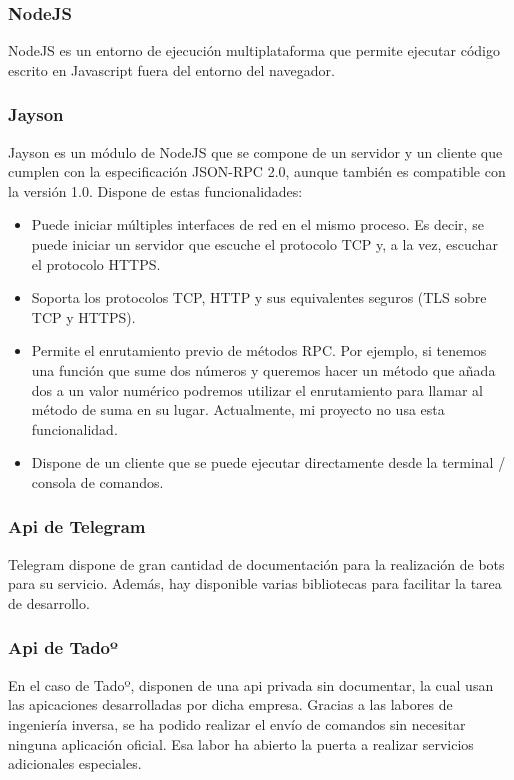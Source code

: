 \documentclass[spanish,12pt, a4paper, twoside]{paper}
\begin{document}
\subsubsection{NodeJS}

NodeJS es un entorno de ejecución multiplataforma que permite ejecutar código escrito en Javascript fuera del entorno del navegador.

\subsubsection{Jayson}

Jayson es un módulo de NodeJS que se compone de un servidor y un cliente que cumplen con la especificación JSON-RPC 2.0, aunque también es compatible con la versión 1.0. Dispone de estas funcionalidades:

\begin{itemize}
\item Puede iniciar múltiples interfaces de red en el mismo proceso. Es decir, se puede iniciar un servidor que escuche el protocolo TCP y, a la vez, escuchar el protocolo HTTPS.
\item Soporta los protocolos TCP, HTTP y sus equivalentes seguros (TLS sobre TCP y HTTPS).
\item Permite el enrutamiento previo de métodos RPC. Por ejemplo, si tenemos una función que sume dos números y queremos hacer un método que añada dos a un valor numérico podremos utilizar el enrutamiento para llamar al método de suma en su lugar. Actualmente, mi proyecto no usa esta funcionalidad.
\item Dispone de un cliente que se puede ejecutar directamente desde la terminal / consola de comandos.
\end{itemize}

\subsubsection{Api de Telegram}

Telegram dispone de gran cantidad de documentación para la realización de bots para su servicio. Además, hay disponible varias bibliotecas para facilitar la tarea de desarrollo.

\subsubsection{Api de Tadoº}

En el caso de Tadoº, disponen de una api privada sin documentar, la cual usan las apicaciones desarrolladas por dicha empresa. Gracias a las labores de ingeniería inversa, se ha podido realizar el envío de comandos sin necesitar ninguna aplicación oficial. Esa labor ha abierto la puerta a realizar servicios adicionales especiales.
\end{document}
